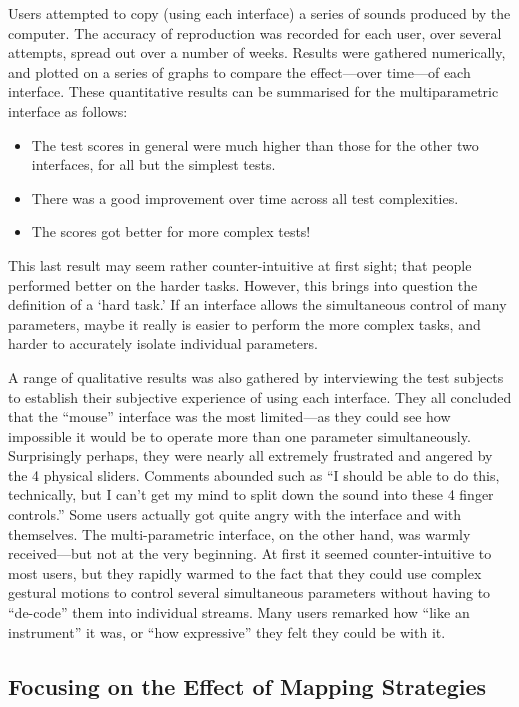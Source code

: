 Users attempted to copy (using each interface) a series of sounds produced by the computer.  The accuracy of reproduction was recorded for each user, over several attempts, spread out over a number of weeks.  Results were gathered numerically, and plotted on a series of graphs to compare the effect---over time---of each interface.  These quantitative results can be summarised for the multiparametric interface as follows:

\begin{itemize}
	\item The test scores in general were much higher than those for the other two
interfaces, for all but the simplest tests.
	\item There was a good improvement over time across all test complexities.
	\item The scores got better for more complex tests!
\end{itemize}

This last result may seem rather counter-intuitive at first sight; that people
performed better on the harder tasks.  However, this brings into question the
definition of a `hard task.'  If an interface allows the simultaneous control of
many parameters, maybe it really is easier to perform the more complex tasks, and
harder to accurately isolate individual parameters.

A range of qualitative results was also gathered by interviewing the test
subjects to establish their subjective experience of using each interface.  They
all concluded that the ``mouse'' interface was the most limited---as they could see
how impossible it would be to operate more than one parameter simultaneously. 
Surprisingly perhaps, they were nearly all extremely frustrated and angered by
the 4 physical sliders.  Comments abounded such as ``I should be able to do this,
technically, but I can't get my mind to split down the sound into these 4 finger
controls.''  Some users actually got quite angry with the interface and with
themselves.  The multi-parametric interface, on the other hand, was warmly
received---but not at the very beginning.  At first it seemed counter-intuitive
to most users, but they rapidly warmed to the fact that they could use complex
gestural motions to control several simultaneous parameters without having to
``de-code'' them into individual streams.  Many users remarked how ``like an
instrument'' it was, or ``how expressive'' they felt they could be with it.

\subsection{Focusing on the Effect of Mapping Strategies}

